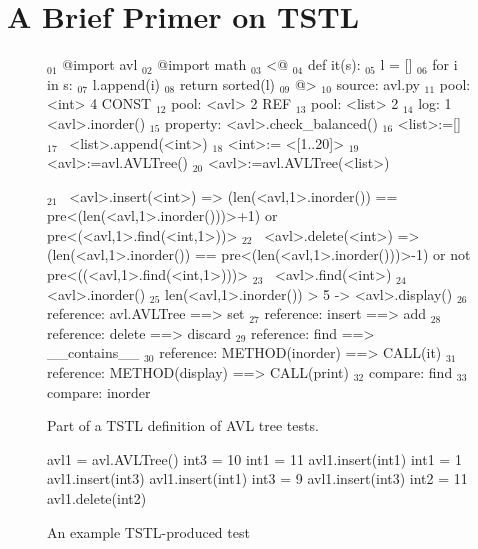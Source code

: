 \section{A Brief Primer on TSTL}

\begin{figure}
{\scriptsize
\begin{code}
$_{01}$ @import avl
$_{02}$ @import math
\vspace{0.1in}
$_{03}$ <@
$_{04}$ def it(s):
$_{05}$     l = []
$_{06}$     for i in s:
$_{07}$        l.append(i)
$_{08}$     return sorted(l)
$_{09}$ @>
\vspace{0.1in}
$_{10}$ source: avl.py
\vspace{0.1in}
$_{11}$ pool: <int> 4 CONST
$_{12}$ pool: <avl> 2 REF
$_{13}$ pool: <list> 2
\vspace{0.1in}
$_{14}$ log: 1 <avl>.inorder()
\vspace{0.1in}
$_{15}$ property: <avl>.check\_balanced()
\vspace{0.1in}
$_{16}$ <list>:=[]
$_{17}$ ~<list>.append(<int>) 
$_{18}$ <int>:= <[1..20]>
\vspace{0.1in}
$_{19}$ <avl>:=avl.AVLTree()
$_{20}$ <avl>:=avl.AVLTree(<list>)
\vspace{0.1in}

$_{21}$ ~<avl>.insert(<int>) => (len(<avl,1>.inorder()) == pre<(len(<avl,1>.inorder()))>+1) 
  or pre<(<avl,1>.find(<int,1>))>
$_{22}$ ~<avl>.delete(<int>) => (len(<avl,1>.inorder()) == pre<(len(<avl,1>.inorder()))>-1) 
  or not pre<((<avl,1>.find(<int,1>)))>
$_{23}$ ~<avl>.find(<int>)
$_{24}$ <avl>.inorder()
$_{25}$ len(<avl,1>.inorder()) > 5 -> <avl>.display()
\vspace{0.1in}
$_{26}$ reference: avl.AVLTree ==> set
$_{27}$ reference: insert ==> add
$_{28}$ reference: delete ==> discard
$_{29}$ reference: find ==> \_\_contains\_\_
$_{30}$ reference: METHOD(inorder) ==> CALL(it)
$_{31}$ reference: METHOD(display) ==> CALL(print)
\vspace{0.1in}
$_{32}$ compare: find
$_{33}$ compare: inorder
\end{code}
}
\caption{Part of a TSTL definition of AVL tree tests.}
\label{fig:example}
\end{figure}


\begin{figure}
{\scriptsize 
\begin{code}
avl1 = avl.AVLTree()  
int3 = 10  
int1 = 11  
avl1.insert(int1) 
int1 = 1  
avl1.insert(int3) 
avl1.insert(int1) 
int3 = 9  
avl1.insert(int3) 
int2 = 11  
avl1.delete(int2) 
\end{code}
}
\caption{An example TSTL-produced test}
\label{fig:avlrun}
\end{figure}



